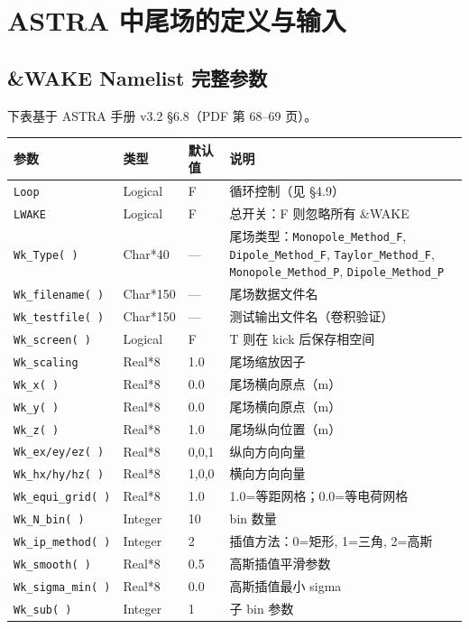 \documentclass[a4paper,11pt]{article}
\begin{document}
\newpage
\section{ASTRA 中尾场的定义与输入}

\subsection{\&WAKE Namelist 完整参数}

下表基于 ASTRA 手册 v3.2 §6.8（PDF 第 68--69 页）。

\begin{center}
\begin{tabular}{p{3.2cm} p{2cm} p{2cm} p{4.5cm}}
\toprule
\textbf{参数} & \textbf{类型} & \textbf{默认值} & \textbf{说明} \\
\midrule
\texttt{Loop} & Logical & F & 循环控制（见 §4.9） \\
\texttt{LWAKE} & Logical & F & 总开关：F 则忽略所有 \&WAKE \\
\texttt{Wk\_Type(\ )} & Char*40 & — & 尾场类型：\texttt{Monopole\_Method\_F}, \texttt{Dipole\_Method\_F}, \texttt{Taylor\_Method\_F}, \texttt{Monopole\_Method\_P}, \texttt{Dipole\_Method\_P} \\
\texttt{Wk\_filename(\ )} & Char*150 & — & 尾场数据文件名 \\
\texttt{Wk\_testfile(\ )} & Char*150 & — & 测试输出文件名（卷积验证） \\
\texttt{Wk\_screen(\ )} & Logical & F & T 则在 kick 后保存相空间 \\
\texttt{Wk\_scaling} & Real*8 & 1.0 & 尾场缩放因子 \\
\texttt{Wk\_x(\ )} & Real*8 & 0.0 & 尾场横向原点（m） \\
\texttt{Wk\_y(\ )} & Real*8 & 0.0 & 尾场横向原点（m） \\
\texttt{Wk\_z(\ )} & Real*8 & 1.0 & 尾场纵向位置（m） \\
\texttt{Wk\_ex/ey/ez(\ )} & Real*8 & 0,0,1 & 纵向方向向量 \\
\texttt{Wk\_hx/hy/hz(\ )} & Real*8 & 1,0,0 & 横向方向向量 \\
\texttt{Wk\_equi\_grid(\ )} & Real*8 & 1.0 & 1.0=等距网格；0.0=等电荷网格 \\
\texttt{Wk\_N\_bin(\ )} & Integer & 10 & bin 数量 \\
\texttt{Wk\_ip\_method(\ )} & Integer & 2 & 插值方法：0=矩形, 1=三角, 2=高斯 \\
\texttt{Wk\_smooth(\ )} & Real*8 & 0.5 & 高斯插值平滑参数 \\
\texttt{Wk\_sigma\_min(\ )} & Real*8 & 0.0 & 高斯插值最小 sigma \\
\texttt{Wk\_sub(\ )} & Integer & 1 & 子 bin 参数 \\
\bottomrule
\end{tabular}
\end{center}
\end{document}
